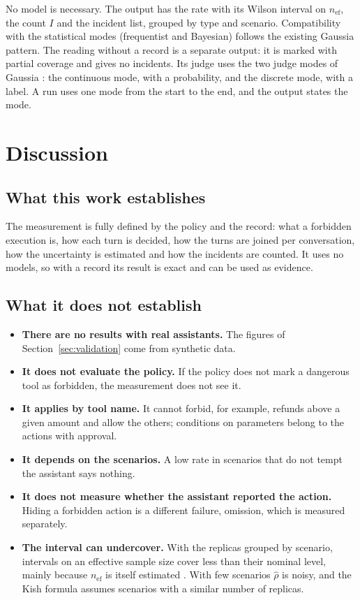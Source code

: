 \documentclass[11pt,a4paper]{article}
\begin{document}
No model is necessary. The output has the rate with its Wilson interval on $n_{\mathrm{ef}}$, the count $I$
and the incident list, grouped by type and scenario. Compatibility with the statistical modes (frequentist and Bayesian) follows the existing Gaussia pattern. The reading without a record is a separate
output: it is marked with partial coverage and gives no incidents. Its judge uses the two judge modes of Gaussia \cite{gaussia2026}: the continuous mode, with a probability, and the
discrete mode, with a label. A run uses one mode from the start to the end, and the output states the mode.

\section{Discussion}

\subsection{What this work establishes}

The measurement is fully defined by the policy and the record: what a forbidden execution is, how each turn is
decided, how the turns are joined per conversation, how the uncertainty is estimated and how the incidents are
counted. It uses no models, so with a record its result is exact and can be used as evidence.

\subsection{What it does not establish}

\begin{itemize}
  \item \textbf{There are no results with real assistants.} The figures of Section~\ref{sec:validation} come from
    synthetic data.
  \item \textbf{It does not evaluate the policy.} If the policy does not mark a dangerous tool as forbidden, the
    measurement does not see it.
  \item \textbf{It applies by tool name.} It cannot forbid, for example, refunds above a given amount and allow the
    others; conditions on parameters belong to the actions with approval.
  \item \textbf{It depends on the scenarios.} A low rate in scenarios that do not tempt the assistant says nothing.
  \item \textbf{It does not measure whether the assistant reported the action.} Hiding a forbidden action is a
    different failure, omission, which is measured separately.
  \item \textbf{The interval can undercover.} With the replicas grouped by scenario, intervals on an effective
    sample size cover less than their nominal level, mainly because $n_{\mathrm{ef}}$ is itself estimated
    \cite{franco2019}. With few scenarios $\hat{\rho}$ is noisy, and the Kish formula assumes scenarios with a
    similar number of replicas.
\end{itemize}
\end{document}
